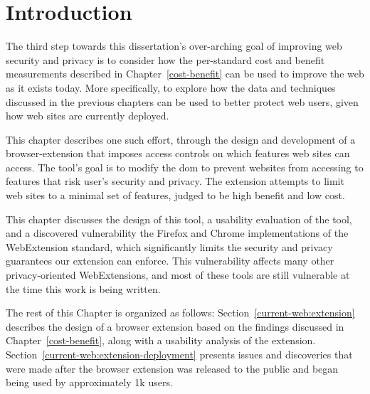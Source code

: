 \section{Introduction}
\label{current-web:current-web}

The third step towards this dissertation's over-arching goal of improving web
security and privacy is to consider how the per-standard cost and benefit
measurements described in Chapter~\ref{cost-benefit} can be used to improve the
web as it exists today.  More specifically, to explore how the data and
techniques discussed in the previous chapters can be used to better protect web
users, given how web sites are currently deployed.

This chapter describes one such effort, through the design and development
of a browser-extension that imposes access controls on which \WAPI features
web sites can access.  The tool's goal is to modify the \gls{dom} to prevent
websites from accessing to features that risk user's security and privacy. The
extension attempts to limit web sites to a minimal set of features, judged to
be high benefit and low cost.

This chapter discusses the design of this tool, a usability evaluation
of the tool, and a discovered vulnerability the Firefox and Chrome
implementations of the WebExtension standard, which significantly limits the
security and privacy guarantees our extension can enforce.  This
vulnerability affects many other privacy-oriented WebExtensions, and most
of these tools are still vulnerable at the time this work is being written.

The rest of this Chapter is organized as follows:
Section~\ref{current-web:extension} describes the design of a browser extension
based on the findings discussed in Chapter~\ref{cost-benefit},
along with a usability analysis of the extension.
Section~\ref{current-web:extension-deployment} presents issues and discoveries
that were made after the browser extension was released to the public and
began being used by approximately 1k users.
